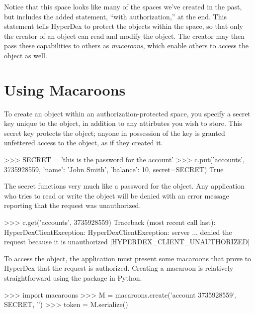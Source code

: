 Notice that this space looks like many of the spaces we've created in the past,
but includes the added statement, ``with authorization,'' at the end.  This
statement tells HyperDex to protect the objects within the space, so that only
the creator of an object can read and modify the object.  The creator may then
pass these capabilities to others as {\em macaroons}, which enable others to
access the object as well.

\section{Using Macaroons}

To create an object within an authorization-protected space, you specify
a secret key unique to the object, in addition to any attirbutes you wish to
store.  This secret key protects the object; anyone in possession of the key is
granted unfettered access to the object, as if they created it.

\begin{pythoncode}
>>> SECRET = 'this is the password for the account'
>>> c.put('accounts', 3735928559, {'name': 'John Smith', 'balance': 10}, secret=SECRET)
True
\end{pythoncode}

The secret functions very much like a password for the object.  Any application
who tries to read or write the object will be denied with an error message
reporting that the request was unauthorized.

\begin{pythoncode}
>>> c.get('accounts', 3735928559)
Traceback (most recent call last):
HyperDexClientException: HyperDexClientException: server ... denied the request because it is unauthorized [HYPERDEX_CLIENT_UNAUTHORIZED]
\end{pythoncode}

To access the object, the application must present some macaroons that prove to
HyperDex that the request is authorized.  Creating a macaroon is relatively
straightforward using the  package in Python.

\begin{pythoncode}
>>> import macaroons
>>> M = macaroons.create('account 3735928559', SECRET, '')
>>> token = M.serialize()
\end{pythoncode}

